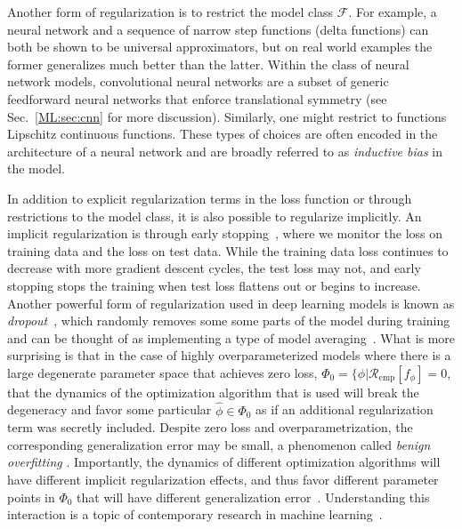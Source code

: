 Another form of regularization is to restrict the model class $\mathcal{F}$. For example, a neural 
network and a sequence of narrow step functions 
(delta functions) can both be shown to be 
universal approximators, but on real world 
examples the former generalizes
much better than the latter. Within the class
of neural network models, 
convolutional neural networks are a subset of generic feedforward neural networks that enforce translational symmetry (see Sec.~\ref{ML:sec:cnn} for more discussion). Similarly, one might restrict to functions Lipschitz continuous functions. These types of choices are often encoded in the architecture of a neural network and are broadly referred to as \textit{inductive bias} in the model.

In addition to explicit regularization terms in the loss function or through restrictions to the model class, it is also possible to regularize implicitly. 
An implicit regularization is
through early stopping~\cite{DBLP:journals/corr/RosascoTV14,Kuusela:2015xqa}, where we monitor the 
loss on training data and the loss on test 
data. While the training data loss continues to 
decrease with more gradient descent cycles, the test loss may not, and early stopping stops the training when test loss flattens out or begins to increase. Another powerful form of regularization used in deep learning models is known as \textit{dropout}~\cite{dropout}, which randomly removes some some parts of the model during training and can be thought of as implementing a type of model averaging~\cite{baldi2013understanding}. What is more surprising is that in the case of highly overparameterized models where there is a large degenerate parameter space that achieves zero loss, $\Phi_0 = \{\phi | \mathcal{R}_\textrm{emp}[f_\phi] = 0$, that the dynamics of the optimization algorithm that is used will break the degeneracy and favor some particular $\hat{\phi} \in \Phi_0$ as if an additional regularization term was secretly included. Despite 
zero loss and overparametrization, the corresponding generalization  error may be small, a phenomenon called
\textit{benign overfitting} \cite{Belkin18}. 
Importantly, the dynamics of different optimization algorithms will have different implicit regularization effects, and thus favor different parameter points in $\Phi_0$ that will have different generalization error~\cite{pmlr-v80-gunasekar18a}. Understanding this interaction is a topic of contemporary research in machine learning~\cite{zdeborova2020understanding}.   




